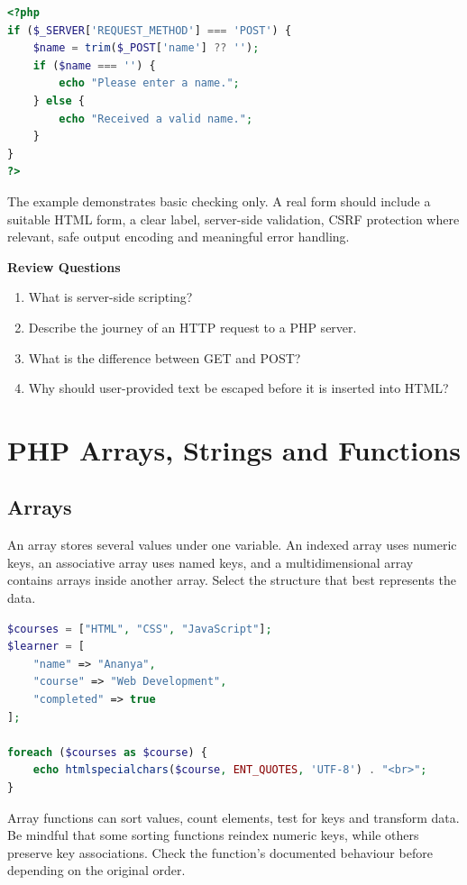 \documentclass[11pt,openany,oneside]{book}
\begin{document}
\begin{lstlisting}[style=webcode,language=PHP]
<?php
if ($_SERVER['REQUEST_METHOD'] === 'POST') {
    $name = trim($_POST['name'] ?? '');
    if ($name === '') {
        echo "Please enter a name.";
    } else {
        echo "Received a valid name.";
    }
}
?>
\end{lstlisting}
The example demonstrates basic checking only. A real form should include a suitable HTML form, a clear label, server-side validation, CSRF protection where relevant, safe output encoding and meaningful error handling.

\par\noindent\textbf{Review Questions}\begin{enumerate}[label=\arabic*.,leftmargin=1.8em,itemsep=2pt,topsep=2pt]
\item What is server-side scripting?
\item Describe the journey of an HTTP request to a PHP server.
\item What is the difference between GET and POST?
\item Why should user-provided text be escaped before it is inserted into HTML?
\end{enumerate}

\chapter{PHP Arrays, Strings and Functions}
\section{Arrays}
An array stores several values under one variable. An indexed array uses numeric keys, an associative array uses named keys, and a multidimensional array contains arrays inside another array. Select the structure that best represents the data.

\begin{lstlisting}[style=webcode,language=PHP]
$courses = ["HTML", "CSS", "JavaScript"];
$learner = [
    "name" => "Ananya",
    "course" => "Web Development",
    "completed" => true
];

foreach ($courses as $course) {
    echo htmlspecialchars($course, ENT_QUOTES, 'UTF-8') . "<br>";
}
\end{lstlisting}
Array functions can sort values, count elements, test for keys and transform data. Be mindful that some sorting functions reindex numeric keys, while others preserve key associations. Check the function's documented behaviour before depending on the original order.
\end{document}
